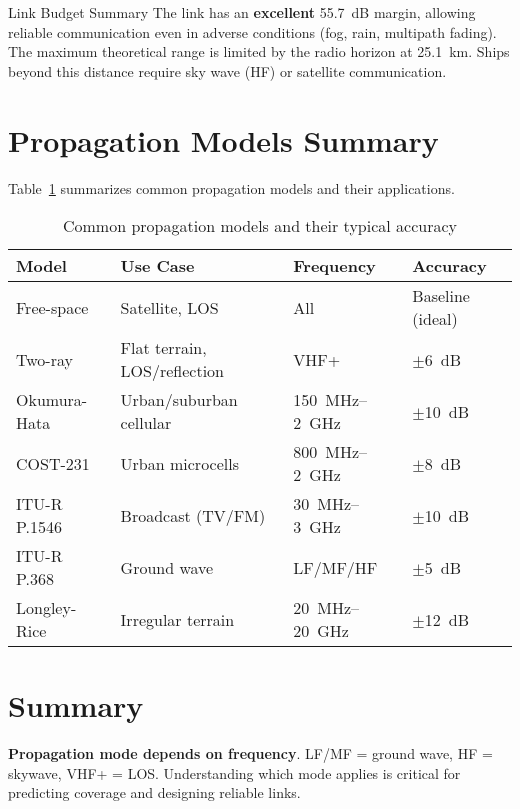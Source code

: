 \begin{calloutbox}[colback=black!8!white,colframe=black]{Link Budget Summary}
The link has an \textbf{excellent} 55.7~dB margin, allowing reliable communication even in adverse conditions (fog, rain, multipath fading). The maximum theoretical range is limited by the radio horizon at 25.1~km. Ships beyond this distance require sky wave (HF) or satellite communication.
\end{calloutbox}

\section{Propagation Models Summary}

Table~\ref{tab:propagation-models} summarizes common propagation models and their applications.

\begin{table}[htbp]
\centering
\caption{Common propagation models and their typical accuracy}
\label{tab:propagation-models}
\begin{tabular}{@{}lp{3.5cm}p{2.5cm}l@{}}
\toprule
\textbf{Model} & \textbf{Use Case} & \textbf{Frequency} & \textbf{Accuracy} \\
\midrule
Free-space & Satellite, LOS & All & Baseline (ideal) \\
Two-ray & Flat terrain, LOS/reflection & VHF+ & $\pm$6~dB \\
Okumura-Hata & Urban/suburban cellular & 150~MHz--2~GHz & $\pm$10~dB \\
COST-231 & Urban microcells & 800~MHz--2~GHz & $\pm$8~dB \\
ITU-R P.1546 & Broadcast (TV/FM) & 30~MHz--3~GHz & $\pm$10~dB \\
ITU-R P.368 & Ground wave & LF/MF/HF & $\pm$5~dB \\
Longley-Rice & Irregular terrain & 20~MHz--20~GHz & $\pm$12~dB \\
\bottomrule
\end{tabular}
\end{table}

\section{Summary}

\begin{keyconcept}
\textbf{Propagation mode depends on frequency}. LF/MF = ground wave, HF = skywave, VHF+ = LOS. Understanding which mode applies is critical for predicting coverage and designing reliable links.
\end{keyconcept}

